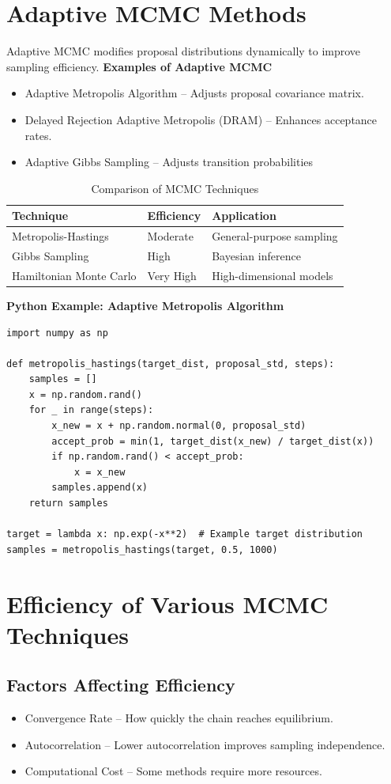 \documentclass[12pt,a4paper]{article}
\begin{document}
\section{ Adaptive MCMC Methods }
Adaptive MCMC modifies proposal distributions dynamically to improve sampling efficiency.
\textbf{Examples of Adaptive MCMC}
\begin{itemize}
    \item Adaptive Metropolis Algorithm – Adjusts proposal covariance matrix.
    \item Delayed Rejection Adaptive Metropolis (DRAM) – Enhances acceptance rates.
    \item Adaptive Gibbs Sampling – Adjusts transition probabilities
\end{itemize}
\begin{table}
	\centering
	\begin{tabular}{lll}
		\hline
		\textbf{Technique} & \textbf{Efficiency} & \textbf{Application} \\
		\hline
		Metropolis-Hastings & Moderate & General-purpose sampling \\
		Gibbs Sampling & High & Bayesian inference \\
		Hamiltonian Monte Carlo & Very High & High-dimensional models \\
		\hline
	\end{tabular}
	\caption{Comparison of MCMC Techniques}
	\label{tab:MCMC}
\end{table}
\textbf{Python Example: Adaptive Metropolis Algorithm}
\begin{verbatim}
import numpy as np

def metropolis_hastings(target_dist, proposal_std, steps):
    samples = []
    x = np.random.rand()
    for _ in range(steps):
        x_new = x + np.random.normal(0, proposal_std)
        accept_prob = min(1, target_dist(x_new) / target_dist(x))
        if np.random.rand() < accept_prob:
            x = x_new
        samples.append(x)
    return samples

target = lambda x: np.exp(-x**2)  # Example target distribution
samples = metropolis_hastings(target, 0.5, 1000)
\end{verbatim}

\section{Efficiency of Various MCMC Techniques}
\subsection{Factors Affecting Efficiency}
\begin{itemize}
    \item Convergence Rate – How quickly the chain reaches equilibrium.
    \item Autocorrelation – Lower autocorrelation improves sampling independence.
    \item Computational Cost – Some methods require more resources.
\end{itemize}
\end{document}
